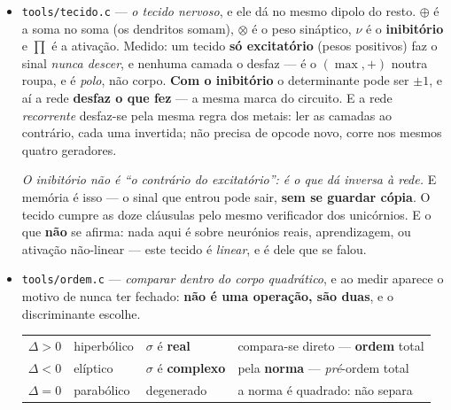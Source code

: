 \documentclass[11pt]{article}
\newcommand{\code}[1]{\texttt{\small #1}}
\theoremstyle{plain}
\theoremstyle{remark}
\begin{document}
\begin{itemize}
\textbf{E o veredito é negativo, que é o que interessa.} anotara $(1-e)/(1+e)$ como candidato a
$T_f/T_q$. Ela dá um $T_f/T_q$ \emph{válido} --- mas \textbf{qualquer} bijeção de $(0,1)$ em
$(0,1)$ daria, e ser uma delas não a distingue de nenhuma outra. Para ser teorema faltaria exibir
o ciclo termodinâmico cuja trajetória \emph{é} a elipse do corte, e não exibi: a elipse da secção
e a elipse de um ciclo no plano $P$--$V$ não são a mesma curva, e não tenho ponte entre elas.
\emph{Parametrização, não teorema} --- fecha como negativo. O que sobrevive do \code{termica.c} é
a geometria da secção, que não depende disto.

\item \code{tools/tecido.c} --- \emph{o tecido nervoso}, e ele dá no mesmo dipolo do resto.
$\oplus$ é a soma no soma (os dendritos somam), $\otimes$ é o peso sináptico, $\nu$ é o
\textbf{inibitório} e $\prod$ é a ativação. Medido: um tecido \textbf{só excitatório} (pesos
positivos) faz o sinal \emph{nunca descer}, e nenhuma camada o desfaz --- é o $(\max,+)$ noutra
roupa, e é \emph{polo}, não corpo. \textbf{Com o inibitório} o determinante pode ser $\pm1$, e aí
a rede \textbf{desfaz o que fez} --- a mesma marca do circuito. E a rede \emph{recorrente}
desfaz-se pela mesma regra dos metais: ler as camadas ao contrário, cada uma invertida; não precisa
de opcode novo, corre nos mesmos quatro geradores.

\emph{O inibitório não é ``o contrário do excitatório'': é o que dá inversa à rede.} E memória é
isso --- o sinal que entrou pode sair, \textbf{sem se guardar cópia}. O tecido cumpre as doze
cláusulas pelo mesmo verificador dos unicórnios. E o que \textbf{não} se afirma: nada aqui é sobre
neurónios reais, aprendizagem, ou ativação não-linear --- este tecido é \emph{linear}, e é dele que
se falou.
\item \code{tools/ordem.c} --- \emph{comparar dentro do corpo quadrático}, e ao medir aparece
o motivo de nunca ter fechado: \textbf{não é uma operação, são duas}, e o discriminante escolhe.

\begin{center}\begin{tabular}{llll}
$\Delta>0$ & hiperbólico & $\sigma$ é \textbf{real} & compara-se direto --- \textbf{ordem} total \\
$\Delta<0$ & elíptico & $\sigma$ é \textbf{complexo} & pela \textbf{norma} --- \emph{pré}-ordem total \\
$\Delta=0$ & parabólico & degenerado & a norma é quadrado: não separa \\
\end{tabular}\end{center}


\end{itemize}
\end{document}
